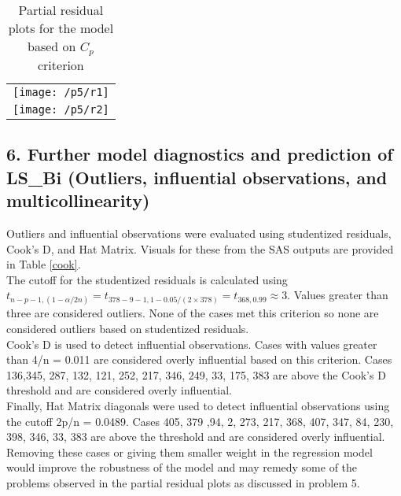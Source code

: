 \documentclass{article}
\begin{document}
\begin{table}[H]
	\centering
	\caption {Partial residual plots for the model based on $C_p$ criterion} \label{residCp} 
	\begin{tabular}{c}
	\begin{minipage}{.7\textwidth}
	\centering
	\texttt{[image: /p5/r1]}
	\end{minipage}
	\\
	\begin{minipage}{.7\textwidth}
	\centering
	\texttt{[image: /p5/r2]}
	\end{minipage}
	\end{tabular}
\end{table}



\subsection{6. Further model diagnostics and prediction of LS\_Bi (Outliers, influential observations, and multicollinearity)}

Outliers and influential observations were evaluated using studentized residuals, Cook’s D, and Hat Matrix. Visuals for these from the SAS outputs are provided in Table \ref{cook}. \\

The cutoff for the studentized residuals is calculated using $t_{n-p-1,(1-α/2n)} = t_{378-9-1, 1-0.05/(2\times378)} = t_{368, 0.99} \approx 3$. Values greater than three are considered outliers. None of the cases met this criterion so none are considered outliers based on studentized residuals.
\\

Cook’s D is used to detect influential observations. Cases with values greater than 4/n = 0.011 are considered overly influential based on this criterion. Cases 136,345, 287, 132, 121, 252, 217, 346, 249, 33, 175, 383 are above the Cook’s D threshold and are considered overly influential.\\

Finally, Hat Matrix diagonals were used to detect influential observations using the cutoff 2p/n = 0.0489. Cases 405,  379 ,94, 2, 273, 217, 368, 407, 347, 84, 230, 398, 346, 33, 383 are above the threshold and are considered overly influential. Removing these cases or giving them smaller weight in the regression model would improve the robustness of the model and may remedy some of the problems observed in the partial residual plots as discussed in problem 5. \\
\end{document}
